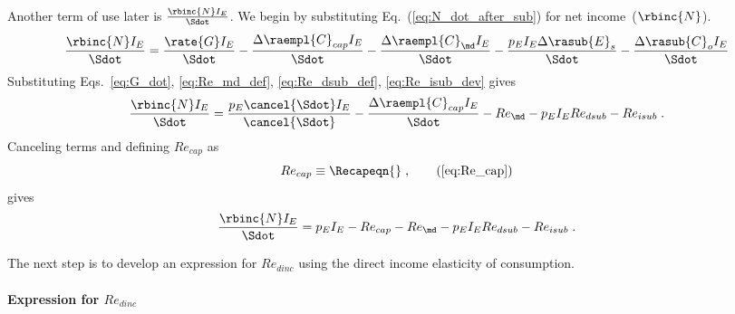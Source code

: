 Another term of use later is $\frac{\rbinc{N} I_E}{\Sdot}$.
We begin by substituting Eq.~(\ref{eq:N_dot_after_sub}) for net income~($\rbinc{N}$).
%
\begin{equation}
  \frac{\rbinc{N} I_E}{\Sdot} = \frac{\rate{G} I_E}{\Sdot}
                                - \frac{\Delta \raempl{C}_{cap} I_E}{\Sdot}
                                - \frac{\Delta \raempl{C}_{\md} I_E}{\Sdot}
                                - \frac{p_E I_E \Delta \rasub{E}_s}{\Sdot}
                                - \frac{\Delta \rasub{C}_o I_E}{\Sdot}
\end{equation}
%
Substituting Eqs.~\ref{eq:G_dot}, \ref{eq:Re_md_def}, \ref{eq:Re_dsub_def}, \ref{eq:Re_isub_dev} gives
%
\begin{equation}
  \frac{\rbinc{N} I_E}{\Sdot} = \frac{p_E \cancel{\Sdot} I_E}{\cancel{\Sdot}}
                                - \frac{\Delta \raempl{C}_{cap} I_E}{\Sdot}
                                - Re_{\md}
                                - p_E I_E Re_{dsub}
                                - Re_{isub} \; .
\end{equation}
%
Canceling terms and defining $Re_{cap}$ as
%
\begin{equation}
  Re_{cap} \equiv \Recapeqn{} \; , \tag{\ref{eq:Re_cap}}
\end{equation}
%
gives
%
\begin{equation} \label{eq:N_dot_I_E_Sdot}
  \frac{\rbinc{N} I_E}{\Sdot} = p_E I_E
                                - Re_{cap}
                                - Re_{\md}
                                - p_E I_E Re_{dsub}
                                - Re_{isub} \; .
\end{equation}

The next step is to develop an expression for $Re_{dinc}$
using the direct income elasticity of consumption.


\paragraph{Expression for $Re_{dinc}$}
\label{sec:Re_dinc}

